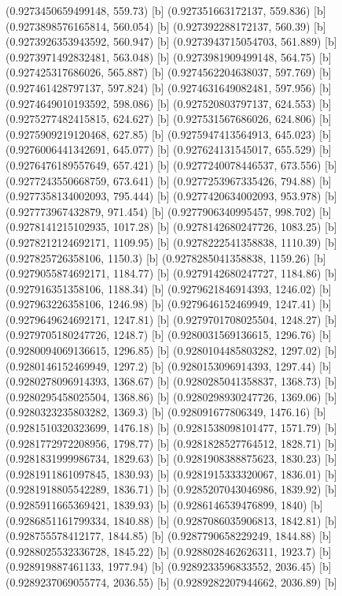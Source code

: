 {{{(0.9273450659499148, 559.73) [b] 
(0.927351663172137, 559.836) [b] 
(0.9273898576165814, 560.054) [b] 
(0.927392288172137, 560.39) [b] 
(0.9273926353943592, 560.947) [b] 
(0.9273943715054703, 561.889) [b] 
(0.9273971492832481, 563.048) [b] 
(0.9273981909499148, 564.75) [b] 
(0.927425317686026, 565.887) [b] 
(0.9274562204638037, 597.769) [b] 
(0.927461428797137, 597.824) [b] 
(0.9274631649082481, 597.956) [b] 
(0.9274649010193592, 598.086) [b] 
(0.927520803797137, 624.553) [b] 
(0.9275277482415815, 624.627) [b] 
(0.927531567686026, 624.806) [b] 
(0.9275909219120468, 627.85) [b] 
(0.9275947413564913, 645.023) [b] 
(0.9276006441342691, 645.077) [b] 
(0.927624131545017, 655.529) [b] 
(0.9276476189557649, 657.421) [b] 
(0.9277240078446537, 673.556) [b] 
(0.9277243550668759, 673.641) [b] 
(0.9277253967335426, 794.88) [b] 
(0.9277358134002093, 795.444) [b] 
(0.9277420634002093, 953.978) [b] 
(0.927773967432879, 971.454) [b] 
(0.9277906340995457, 998.702) [b] 
(0.9278141215102935, 1017.28) [b] 
(0.9278142680247726, 1083.25) [b] 
(0.9278212124692171, 1109.95) [b] 
(0.9278222541358838, 1110.39) [b] 
(0.927825726358106, 1150.3) [b] 
(0.9278285041358838, 1159.26) [b] 
(0.9279055874692171, 1184.77) [b] 
(0.9279142680247727, 1184.86) [b] 
(0.927916351358106, 1188.34) [b] 
(0.9279621846914393, 1246.02) [b] 
(0.927963226358106, 1246.98) [b] 
(0.9279646152469949, 1247.41) [b] 
(0.9279649624692171, 1247.81) [b] 
(0.9279701708025504, 1248.27) [b] 
(0.9279705180247726, 1248.7) [b] 
(0.9280031569136615, 1296.76) [b] 
(0.9280094069136615, 1296.85) [b] 
(0.9280104485803282, 1297.02) [b] 
(0.9280146152469949, 1297.2) [b] 
(0.9280153096914393, 1297.44) [b] 
(0.9280278096914393, 1368.67) [b] 
(0.9280285041358837, 1368.73) [b] 
(0.9280295458025504, 1368.86) [b] 
(0.9280298930247726, 1369.06) [b] 
(0.9280323235803282, 1369.3) [b] 
(0.928091677806349, 1476.16) [b] 
(0.9281510320323699, 1476.18) [b] 
(0.9281538098101477, 1571.79) [b] 
(0.9281772972208956, 1798.77) [b] 
(0.9281828527764512, 1828.71) [b] 
(0.9281831999986734, 1829.63) [b] 
(0.9281908388875623, 1830.23) [b] 
(0.9281911861097845, 1830.93) [b] 
(0.9281915333320067, 1836.01) [b] 
(0.9281918805542289, 1836.71) [b] 
(0.9285207043046986, 1839.92) [b] 
(0.9285911665369421, 1839.93) [b] 
(0.9286146539476899, 1840) [b] 
(0.9286851161799334, 1840.88) [b] 
(0.9287086035906813, 1842.81) [b] 
(0.928755578412177, 1844.85) [b] 
(0.9287790658229249, 1844.88) [b] 
(0.9288025532336728, 1845.22) [b] 
(0.9288028462626311, 1923.7) [b] 
(0.928919887461133, 1977.94) [b] 
(0.9289233596833552, 2036.45) [b] 
(0.9289237069055774, 2036.55) [b] 
(0.9289282207944662, 2036.89) [b] 
}}}
